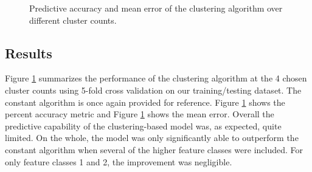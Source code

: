\begin{figure}[t]
\centering
{}
\caption{Predictive accuracy and mean error of the clustering algorithm over different cluster counts.}
\label{clustering_results}
\end{figure}

\subsection{Results}

Figure \ref{clustering_results} summarizes the performance of the clustering algorithm at the 4 chosen cluster counts using 5-fold cross validation on our training/testing dataset.  The constant algorithm is once again provided for reference.  Figure \ref{clustering_results}  shows the percent accuracy metric and Figure \ref{clustering_results}  shows the mean error.  Overall the predictive capability of the clustering-based model was, as expected, quite limited.  On the whole, the model was only significantly able to outperform the constant algorithm when several of the higher feature classes were included. For only feature classes 1 and 2, the improvement was negligible.

